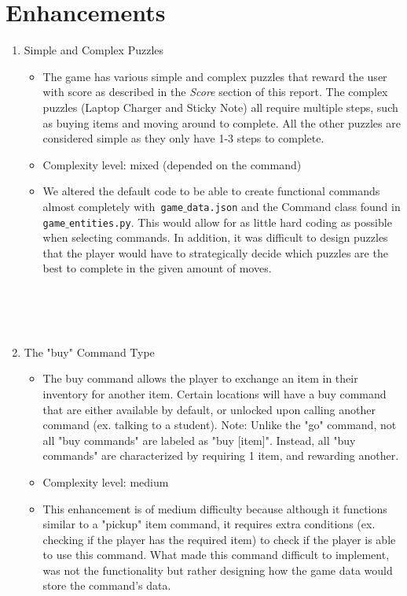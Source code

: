 \documentclass[11pt]{article}
\begin{document}
\section*{Enhancements}
\begin{enumerate}
    \item Simple and Complex Puzzles
    \begin{itemize}
        \item The game has various simple and complex puzzles that reward the user with score as described in the \textit{Score} section of this report. The complex puzzles (Laptop Charger and Sticky Note) all require multiple steps, such as buying items and moving around to complete. All the other puzzles are considered simple as they only have 1-3 steps to complete.
        \item Complexity level: mixed (depended on the command)
        \item We altered the default code to be able to create functional commands almost completely with\texttt{ game$\_$data.json} and the Command class found in \texttt{game$\_$entities.py}. This would allow for as little hard coding as possible when selecting commands. In addition, it was difficult to design puzzles that the player would have to strategically decide which puzzles are the best to complete in the given amount of moves.
    \end{itemize}
\\\\\\
    \item The "buy" Command Type
    \begin{itemize}
        \item The buy command allows the player to exchange an item in their inventory for another item. Certain locations will have a buy command that are either available by default, or unlocked upon calling another command (ex. talking to a student).
Note: Unlike the "go" command, not all "buy commands" are labeled as "buy [item]". Instead, all "buy commands" are characterized by requiring 1 item, and rewarding another.
        \item Complexity level: medium
        \item This enhancement is of medium difficulty because although it functions similar to a "pickup" item command, it requires extra conditions (ex. checking if the player has the required item) to check if the player is able to use this command. What made this command difficult to implement, was not the functionality but rather designing how the game data would store the command's data.

\end{itemize}
\end{enumerate}
\end{document}

